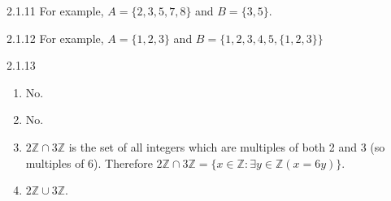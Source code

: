 \documentclass[11pt,]{book}
\theoremstyle{ptxplainnotitle}
\theoremstyle{ptxplaintitle}
\theoremstyle{ptxdefinitionnotitle}
\theoremstyle{ptxdefinitiontitle}
\theoremstyle{ptxdefinitionnotitle}
\theoremstyle{ptxdefinitiontitle}
\theoremstyle{ptxdefinitionnotitle}
\theoremstyle{ptxdefinitiontitle}
\theoremstyle{ptxdefinitiontitlenonumber}
\theoremstyle{ptxdefinitiontitlenonumber}
\numberwithin{equation}{chapter}
\newcommand{\Z}{\mathbb Z}
\newcommand{\st}{:}
\begin{document}
\begin{divisionexercise}{2.1.11}
\textbf{}\hypertarget{p-919}{}%
For example, \(A = \{2,3,5,7,8\}\) and \(B = \{3,5\}\).%
\end{divisionexercise}%
\begin{divisionexercise}{2.1.12}
\textbf{}\hypertarget{p-921}{}%
For example, \(A = \{1,2,3\}\) and \(B = \{1,2,3,4,5,\{1,2,3\}\}\)%
\end{divisionexercise}%
\begin{divisionexercise}{2.1.13}
\textbf{}\hypertarget{p-927}{}%
\leavevmode%
\begin{enumerate}[label=(\alph*)]
\item\hypertarget{li-409}{}\hypertarget{p-928}{}%
No.%
\item\hypertarget{li-410}{}\hypertarget{p-929}{}%
No.%
\item\hypertarget{li-411}{}\(2\Z \cap 3\Z\) is the set of all integers which are multiples of both 2 and 3 (so multiples of 6). Therefore \(2\Z \cap 3\Z = \{x \in \Z \st \exists y\in \Z(x = 6y)\}\).%
\item\hypertarget{li-412}{}\(2\Z \cup 3\Z\).%
\end{enumerate}
%
\end{divisionexercise}%
\end{document}
